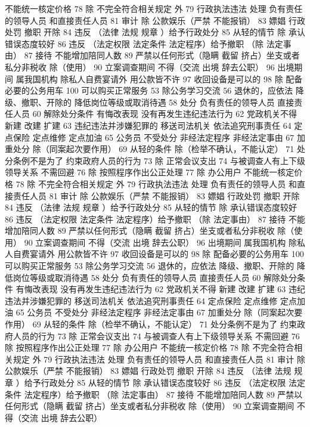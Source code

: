 \documentclass[11pt]{ctexart}
\begin{document}
不能统一核定价格
78 除 不完全符合相关规定 外
79 行政执法违法 处理
负有责任的领导人员
和直接责任人员
81 审计
除 公款娱乐（严禁 不能报销）
83 嫖娼 行政处罚
撤职 开除
84 违反 （法律 法规 规章 ）给予行政处分
85 从轻的情节
除 承认错误态度较好
86 违反 （法定权限 法定条件 法定程序）给予撤职
（除 法定事由）
87 接待 不能增加陪同人数
89 严禁以任何形式（隐瞒 截留 挤占）坐支或者私分非税收
除（使用）
90 立案调查期间 不得（交流 出境 辞去公职）
96 出境期间 属我国机构 除私人自费宴请外 用公款皆不许
97 收回设备是可以的
98 除 配备必要的公务用车
100 可以购买正常服务
53 除公务学习交流
56 退休的，应依法
降级、撤职、开除的 降低岗位等级或取消待遇
58 处分
负有责任的领导人员
直接责任人员
60 解除处分条件
有悔改表现
没有再发生违纪违法行为
62 党政机关不得
新建 改建 扩建
63 违纪违法并涉嫌犯罪的
移送司法机关
依法追究刑事责任
64 定点保险 定点维修 定点加油
65 公务员 不受处分
非经法定程序
非经法定事由
67 加重处分
除（同案起次要作用）
69 从轻的条件
除（检举不确认，不能认定）
71 处分条例不是为了
约束政府人员的行为
73 除 正常会议支出
74 与被调查人有上下级领导关系 不需回避
76 除 按照程序作出公正处理
77 除 办公用户
不能统一核定价格
78 除 不完全符合相关规定 外
79 行政执法违法 处理
负有责任的领导人员
和直接责任人员
81 审计
除 公款娱乐（严禁 不能报销）
83 嫖娼 行政处罚
撤职 开除
84 违反 （法律 法规 规章 ）给予行政处分
85 从轻的情节
除 承认错误态度较好
86 违反 （法定权限 法定条件 法定程序）给予撤职
（除 法定事由）
87 接待 不能增加陪同人数
89 严禁以任何形式（隐瞒 截留 挤占）坐支或者私分非税收
除（使用）
90 立案调查期间 不得（交流 出境 辞去公职）
96 出境期间 属我国机构 除私人自费宴请外 用公款皆不许
97 收回设备是可以的
98 除 配备必要的公务用车
100 可以购买正常服务
53 除公务学习交流
56 退休的，应依法
降级、撤职、开除的 降低岗位等级或取消待遇
58 处分
负有责任的领导人员
直接责任人员
60 解除处分条件
有悔改表现
没有再发生违纪违法行为
62 党政机关不得
新建 改建 扩建
63 违纪违法并涉嫌犯罪的
移送司法机关
依法追究刑事责任
64 定点保险 定点维修 定点加油
65 公务员 不受处分
非经法定程序
非经法定事由
67 加重处分
除（同案起次要作用）
69 从轻的条件
除（检举不确认，不能认定）
71 处分条例不是为了
约束政府人员的行为
73 除 正常会议支出
74 与被调查人有上下级领导关系 不需回避
76 除 按照程序作出公正处理
77 除 办公用户
不能统一核定价格
78 除 不完全符合相关规定 外
79 行政执法违法 处理
负有责任的领导人员
和直接责任人员
81 审计
除 公款娱乐（严禁 不能报销）
83 嫖娼 行政处罚
撤职 开除
84 违反 （法律 法规 规章 ）给予行政处分
85 从轻的情节
除 承认错误态度较好
86 违反 （法定权限 法定条件 法定程序）给予撤职
（除 法定事由）
87 接待 不能增加陪同人数
89 严禁以任何形式（隐瞒 截留 挤占）坐支或者私分非税收
除（使用）
90 立案调查期间 不得（交流 出境 辞去公职）
\end{document}
